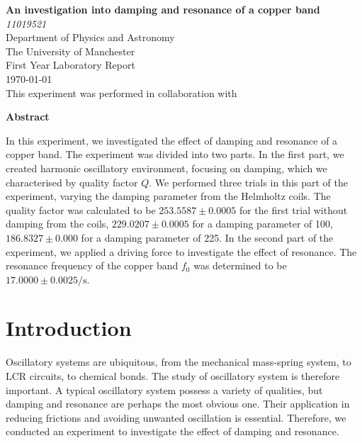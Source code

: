 \documentclass[a4paper,12pt]{article}
\begin{document}
{\pagestyle{empty}
	\begin{center}
		{\LARGE\bfseries An investigation into damping and resonance of a copper band\\
		
		}
		\vspace{\baselineskip}
		{\itshape 
		11019521\\
		}
		\vspace{\baselineskip}	
		Department of Physics and Astronomy\\
		The University of Manchester\\
		\vspace{\baselineskip}	
		First Year Laboratory Report\\
		\vspace{\baselineskip}	
		{\today}\\
		\vspace{2\baselineskip}		
		This experiment was performed in collaboration with 
	\end{center}
	\vspace{4\baselineskip}
	\textbf{Abstract}
	
	In this experiment, we investigated the effect of damping and resonance of a copper band. The experiment was divided into two parts. In the first part, we created harmonic oscillatory environment, focusing on damping, which we characterised by quality factor \( Q \). We performed three trials in this part of the experiment, varying the damping parameter from the Helmholtz coils. The quality factor was calculated to be \( 253.5587 \pm 0.0005 \) for the first trial without damping from the coils, \(229.0207 \pm 0.0005 \) for a damping parameter of 100, \( 186.8327 \pm 0.000 \) for a damping parameter of 225. In the second part of the experiment, we applied a driving force to investigate the effect of resonance. The resonance frequency of the copper band \( f_0 \) was determined to be \( 17.0000 \pm 0.0025 \unit{\per\second} \).  
\clearpage}
\section{Introduction}
Oscillatory systems are ubiquitous, from the mechanical mass-spring system, to LCR circuits, to chemical bonds. The study of oscillatory system is therefore important.  A typical oscillatory system possess a variety of qualities, but damping and resonance \cite{resonancescience} are perhaps the most obvious one. Their application in reducing frictions and avoiding unwanted oscillation is essential. Therefore, we conducted an experiment to investigate the effect of damping and resonance.
\end{document}
